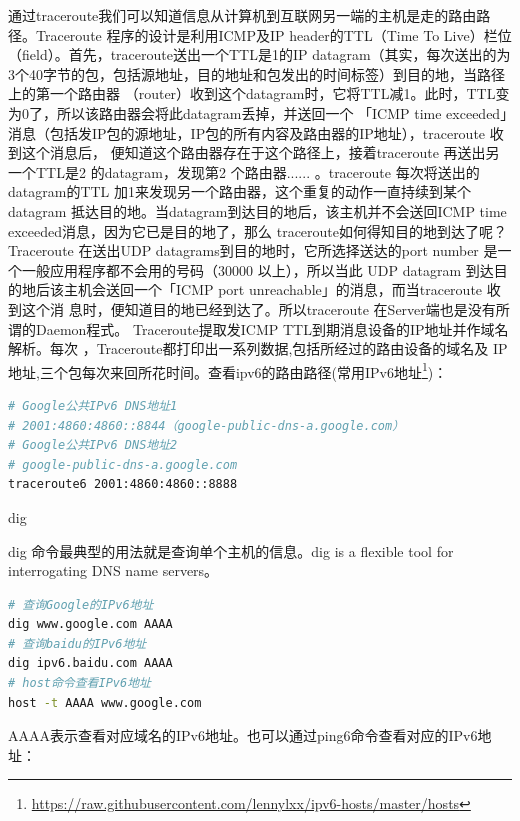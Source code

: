 \documentclass[8pt]{book}
\makeatletter
\numberwithin{dummy}{section}
\theoremstyle{ocrenumbox}
\theoremstyle{blacknumex}
\theoremstyle{blacknumbox}
\theoremstyle{ocrenum}
\renewcommand{\subsection}{\@startsection {subsection}{2}{\z@}
	{-3ex \@plus -0.1ex \@minus -.4ex}
	{0.5ex \@plus.2ex }
	{\normalfont\sffamily\bfseries}}
\makeatother
\begin{document}
通过traceroute我们可以知道信息从计算机到互联网另一端的主机是走的路由路径。Traceroute 程序的设计是利用ICMP及IP header的TTL（Time To Live）栏位（field）。首先，traceroute送出一个TTL是1的IP datagram（其实，每次送出的为3个40字节的包，包括源地址，目的地址和包发出的时间标签）到目的地，当路径上的第一个路由器 （router）收到这个datagram时，它将TTL减1。此时，TTL变为0了，所以该路由器会将此datagram丢掉，并送回一个 「ICMP time exceeded」消息（包括发IP包的源地址，IP包的所有内容及路由器的IP地址），traceroute 收到这个消息后， 便知道这个路由器存在于这个路径上，接着traceroute 再送出另一个TTL是2 的datagram，发现第2 个路由器...... 。traceroute 每次将送出的datagram的TTL 加1来发现另一个路由器，这个重复的动作一直持续到某个datagram 抵达目的地。当datagram到达目的地后，该主机并不会送回ICMP time exceeded消息，因为它已是目的地了，那么 traceroute如何得知目的地到达了呢？Traceroute 在送出UDP datagrams到目的地时，它所选择送达的port number 是一个一般应用程序都不会用的号码（30000 以上），所以当此 UDP datagram 到达目的地后该主机会送回一个「ICMP port unreachable」的消息，而当traceroute 收到这个消 息时，便知道目的地已经到达了。所以traceroute 在Server端也是没有所谓的Daemon程式。
Traceroute提取发ICMP TTL到期消息设备的IP地址并作域名解析。每次 ，Traceroute都打印出一系列数据,包括所经过的路由设备的域名及 IP地址,三个包每次来回所花时间。查看ipv6的路由路径(常用IPv6地址\footnote{\url{https://raw.githubusercontent.com/lennylxx/ipv6-hosts/master/hosts}})：


\begin{lstlisting}[language=Bash]
# Google公共IPv6 DNS地址1
# 2001:4860:4860::8844（google-public-dns-a.google.com）
# Google公共IPv6 DNS地址2
# google-public-dns-a.google.com
traceroute6 2001:4860:4860::8888
\end{lstlisting}
     

\subsection{dig}

dig 命令最典型的用法就是查询单个主机的信息。dig is a flexible tool for interrogating DNS name servers。

\begin{lstlisting}[language=Bash]
# 查询Google的IPv6地址
dig www.google.com AAAA
# 查询baidu的IPv6地址
dig ipv6.baidu.com AAAA
# host命令查看IPv6地址
host -t AAAA www.google.com
\end{lstlisting}


AAAA表示查看对应域名的IPv6地址。也可以通过ping6命令查看对应的IPv6地址：
\end{document}
